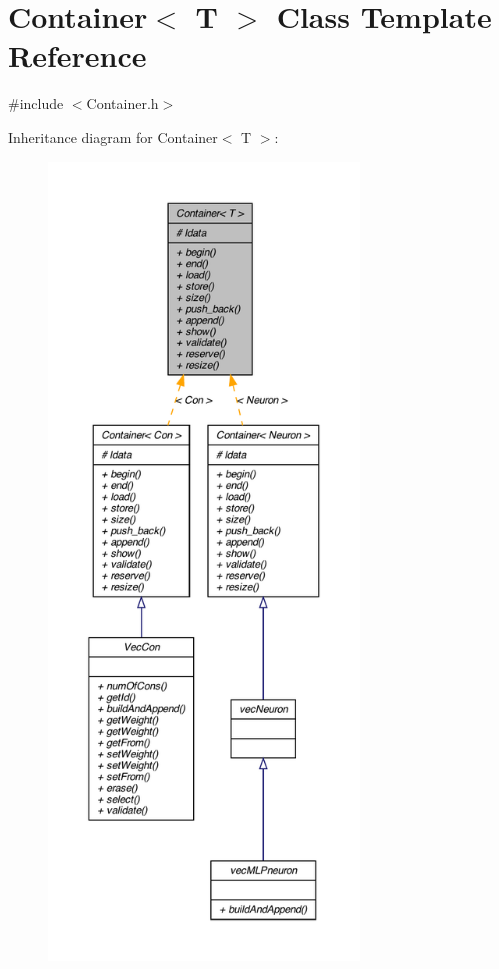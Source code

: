 \hypertarget{class_container}{
\section{Container$<$ T $>$ Class Template Reference}
\label{class_container}
}


{\ttfamily \#include $<$Container.h$>$}



Inheritance diagram for Container$<$ T $>$:
\nopagebreak
\begin{figure}[H]
\begin{center}
\leavevmode
\includegraphics[height=600pt]{class_container__inherit__graph}
\end{center}
\end{figure}



